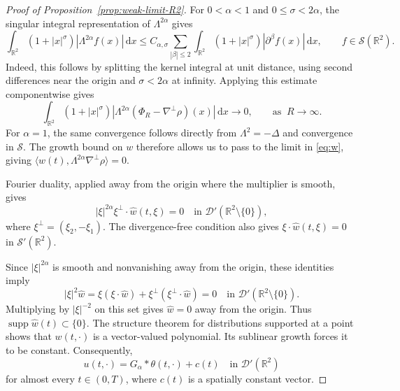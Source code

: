 \documentclass[reqno,11pt,a4paper]{amsart}
\newcommand{\dd}{\mathrm{d}}
\begin{document}
\begin{proof}[Proof of Proposition~\ref{prop:weak-limit-R2}]
For $0<\alpha<1$ and $0\leq\sigma<2\alpha$,
the singular integral representation of $\Lambda^{2\alpha}$
gives
\[
  \int_{\mathbb R^2}(1+|x|^\sigma)
    |\Lambda^{2\alpha}f(x)|\,\dd x
  \leq C_{\alpha,\sigma}
  \sum_{|\beta|\leq2}
  \int_{\mathbb R^2}(1+|x|^\sigma)
    |\partial^\beta f(x)|\,\dd x,
  \qquad f\in\mathcal S(\mathbb R^2).
\]
Indeed, this follows by splitting the kernel integral
at unit distance, using second differences near the origin
and $\sigma<2\alpha$ at infinity.
Applying this estimate componentwise gives
\[
  \int_{\mathbb R^2}(1+|x|^\sigma)
  \left|
    \Lambda^{2\alpha}
    (\Phi_R-\nabla^\perp\rho)(x)
  \right|\,\dd x
  \longrightarrow0,\qquad\textrm{as}\;\; R\rightarrow \infty.
\]
For $\alpha=1$, the same convergence follows directly
from $\Lambda^2=-\Delta$ and convergence in $\mathcal S$.
The growth bound on $w$ therefore allows us to pass
to the limit in \eqref{eq:w}, giving $\langle w(t),\Lambda^{2\alpha}\nabla^\perp\rho\rangle=0$. 

Fourier duality, applied away from the origin
where the multiplier is smooth, gives
\[
  |\xi|^{2\alpha}\xi^\perp\cdot\widehat w(t,\xi)=0
  \quad\text{in }
  \mathcal D'(\mathbb R^2\setminus\{0\}),
\]
where $\xi^\perp=(\xi_2,-\xi_1)$.
The divergence-free condition also gives $\xi\cdot\widehat w(t,\xi)=0$ in $\mathcal S'(\mathbb R^2)$. 

Since $|\xi|^{2\alpha}$ is smooth and nonvanishing
away from the origin, these identities imply
\[
  |\xi|^2\widehat w
  =
  \xi(\xi\cdot\widehat w)
  +\xi^\perp(\xi^\perp\cdot\widehat w)
  =0
  \quad\text{in }
  \mathcal D'(\mathbb R^2\setminus\{0\}).
\]
Multiplying by $|\xi|^{-2}$ on this set gives
$\widehat w=0$ away from the origin.
Thus $\operatorname{supp}\widehat w(t)\subset\{0\}$.
The structure theorem for distributions supported
at a point shows that $w(t,\cdot)$ is
a vector-valued polynomial.
Its sublinear growth forces it to be constant.
Consequently,
\begin{equation}\label{eq:velocity-up-to-constant}
  u(t,\cdot)=G_\alpha*\theta(t,\cdot)+c(t)
  \quad\text{in }\mathcal D'(\mathbb R^2)
\end{equation}
for almost every $t\in(0,T)$,
where $c(t)$ is a spatially constant vector.


\end{proof}
\end{document}
